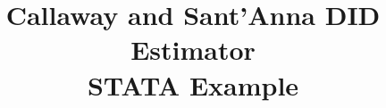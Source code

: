 \documentclass[dvipsnames,hyperref={pdfpagelabels=false}]{beamer}
\begin{document}
%	
%
%
%
%	
%


\title[]  
{Callaway and Sant'Anna DID Estimator \\ STATA Example}


\author 
{}

\institute{}






\date
{}


\begin{frame}{}
	\titlepage
\end{frame}
\end{document}
